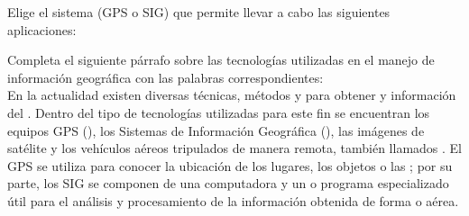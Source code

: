 \documentclass[11pt, a4paper, answers]{exam}
\begin{document}
\begin{questions}
\question Elige el sistema (GPS o SIG) que permite llevar a cabo las siguientes aplicaciones:

\question Completa el siguiente párrafo sobre las tecnologías utilizadas en el manejo de información geográfica con las palabras correspondientes:
\vspace{0.3cm}\\
En la actualidad existen diversas técnicas, métodos y \fillin[tecnologías][2.5cm] para obtener y \fillin[procesar][2cm] información del . Dentro del tipo de tecnologías utilizadas para este fin se encuentran los equipos GPS (), los Sistemas de Información Geográfica (\fillin[SIG][1.5cm]), las imágenes de satélite y los vehículos aéreos tripulados de manera remota, también llamados \fillin[drones][2cm]. El GPS se utiliza para conocer la ubicación de los lugares, los objetos o las \fillin[personas][2.2cm]; por su parte, los SIG se componen de una computadora y un \fillin[software][2cm] o programa especializado útil para el análisis y procesamiento de la información obtenida de forma \fillin[satelital][2cm] o aérea.


\end{questions}
\end{document}
